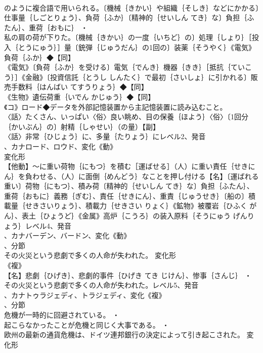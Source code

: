 \documentclass[8pt]{extreport}
\begin{document}
\begin{CJK}{UTF8}{min}
\\	のように複合語で用いられる。〔機械｛きかい｝や組織｛そしき｝などにかかる〕仕事量｛しごとりょう｝、負荷｛ふか｝〔精神的｛せいしん てき｝な〕負担｛ふたん｝、重荷｛おもに｝ ・
\\	私の肩の荷が下りた。〔機械｛きかい｝の一度｛いちど｝の〕処理｛しょり｝［投入｛とうにゅう｝］量〔銃弾｛じゅうだん｝の1回の〕装薬｛そうやく｝《電気》負荷｛ふか｝◆【同】
\\	《電気》〔負荷｛ふか｝を受ける〕電気｛でんき｝機器｛きき｝［抵抗｛ていこう｝］《金融》〔投資信託｛とうし しんたく｝で最初｛さいしょ｝に引かれる〕販売手数料｛はんばい てすうりょう｝◆【同】
\\	《生物》遺伝荷重｛いでん かじゅう｝◆【同】
\\	《コ》ロード◆データを外部記憶装置から主記憶装置に読み込むこと。
\\	〈話〉たくさん、いっぱい〈俗〉良い眺め、目の保養｛ほよう｝〈俗〉〔1回分｛かいぶん｝の〕射精｛しゃせい｝（の量）【副】
\\	〈話〉非常｛ひじょう｝に、多量｛たりょう｝にレベル2、発音
\\	、カナロード、ロウド、変化《動》
\\	変化形 
\\	【他動】～に重い荷物｛にもつ｝を積む［運ばせる］（人）に重い責任｛せきにん｝を負わせる、（人）に面倒｛めんどう｝なことを押し付ける【名】〔運ばれる重い〕荷物｛にもつ｝、積み荷〔精神的｛せいしん てき｝な〕負担｛ふたん｝、重荷｛おもに｝義務｛ぎむ｝、責任｛せきにん｝、重責｛じゅうせき｝〔船の〕積載量｛せきさいりょう｝、積載力｛せきさい りょく｝《鉱物》被覆岩｛ひふく がん｝、表土｛ひょうど｝《金属》高炉｛こうろ｝の装入原料｛そうにゅう げんりょう｝レベル4、発音
\\	、カナバーデン、バードン、変化《動》
\\	、分節
\\	その火災という悲劇で多くの人命が失われた。	変化形 
\\	《複》
\\	【名】悲劇｛ひげき｝、悲劇的事件｛ひげき てき じけん｝、惨事｛さんじ｝ ・
\\	その火災という悲劇で多くの人命が失われた。レベル5、発音
\\	、カナトゥラジェディ、トラジェディ、変化《複》
\\	、分節
\\	危機が一時的に回避されている。 ・
\\	起こらなかったことが危機と同じく大事である。 ・
\\	欧州の最新の通貨危機は、ドイツ連邦銀行の決定によって引き起こされた。	変化形 

\end{CJK}
\end{document}
